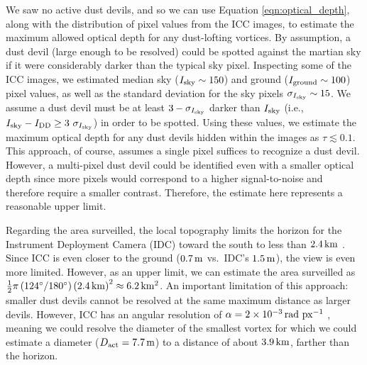 \documentclass{aastex63}
\begin{document}
We saw no active dust devils, and so we can use Equation \ref{eqn:optical_depth}, along with the distribution of pixel values from the ICC images, to estimate the maximum allowed optical depth for any dust-lofting vortices. By assumption, a dust devil (large enough to be resolved) could be spotted against the martian sky if it were considerably darker than the typical sky pixel. Inspecting some of the ICC images, we estimated median sky ($I_{\rm sky} \sim 150$) and ground ($I_{\rm ground} \sim 100$) pixel values, as well as the standard deviation for the sky pixels $\sigma_{I_{\rm sky}} \sim 15$. We assume a dust devil must be at least $3-\sigma_{I_{\rm sky}}$ darker than $I_{\rm sky}$ (i.e., $I_{\rm sky} - I_{\rm DD} \ge 3\ \sigma_{I_{\rm sky}}$) in order to be spotted. Using these values, we estimate the maximum optical depth for any dust devils hidden within the images as $\tau \lesssim 0.1$. This approach, of course, assumes a single pixel suffices to recognize a dust devil. However, a multi-pixel dust devil could be identified even with a smaller optical depth since more pixels would correspond to a higher signal-to-noise and therefore require a smaller contrast. Therefore, the estimate here represents a reasonable upper limit.

Regarding the area surveilled, the local topography limits the horizon for the Instrument Deployment Camera (IDC) toward the south to less than $2.4\,{\rm km}$ \citep{2020E&SS....701248G}. Since ICC is even closer to the ground ($0.7\,{\rm m}$ vs.~IDC's $1.5\,{\rm m}$), the view is even more limited. However, as an upper limit, we can estimate the area surveilled as $\frac{1}{2} \pi \left(124^\circ/180^\circ\right) \left( 2.4\,{\rm km} \right)^2 \approx 6.2\,{\rm km^2}$. An important limitation of this approach: smaller dust devils cannot be resolved at the same maximum distance as larger devils. However, ICC has an angular resolution of $\alpha = 2\times10^{-3}\,{\rm rad\ px^{-1}}$ \citep{2018SSRv..214..105M}, meaning we could resolve the diameter of the smallest vortex for which we could estimate a diameter ($D_{\rm act} = 7.7\,{\rm m}$) to a distance of about $3.9\,{\rm km}$, farther than the horizon.
\end{document}
